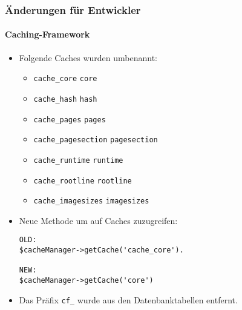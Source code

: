 
\begin{frame}[fragile]
	\frametitle{Änderungen für Entwickler}
	\framesubtitle{Caching-Framework}

	\lstset{basicstyle=\tiny\ttfamily}

	\begin{itemize}
		\item Folgende Caches wurden umbenannt:

			\begin{itemize}\smaller
				\item \texttt{cache\_core} \textrightarrow\hspace{0.1cm}\texttt{core}
				\item \texttt{cache\_hash} \textrightarrow\hspace{0.1cm}\texttt{hash}
				\item \texttt{cache\_pages} \textrightarrow\hspace{0.1cm}\texttt{pages}
				\item \texttt{cache\_pagesection} \textrightarrow\hspace{0.1cm}\texttt{pagesection}
				\item \texttt{cache\_runtime} \textrightarrow\hspace{0.1cm}\texttt{runtime}
				\item \texttt{cache\_rootline} \textrightarrow\hspace{0.1cm}\texttt{rootline}
				\item \texttt{cache\_imagesizes} \textrightarrow\hspace{0.1cm}\texttt{imagesizes}
			\end{itemize}\normalsize

		\item Neue Methode um auf Caches zuzugreifen:

\begin{lstlisting}
OLD:
$cacheManager->getCache('cache_core').

NEW:
$cacheManager->getCache('core')
\end{lstlisting}

		\item Das Präfix \texttt{cf\_}  wurde aus den Datenbanktabellen entfernt.
	\end{itemize}

\end{frame}

